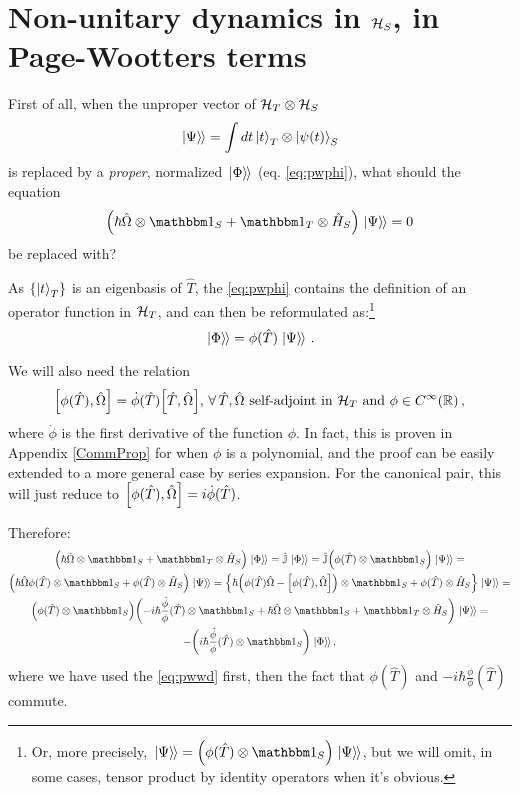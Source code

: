 \section{Non-unitary dynamics in $\mathcal{H}_S$, in Page-Wootters terms}

First of all,
when the unproper vector of $\mathcal{H}_T \otimes \mathcal{H}_S$
\begin{equation}
  \left.\left| \Psi \right\rangle\hspace{-0.115em}\right\rangle = \int dt \ket{t}_{T} \otimes \ket{\psi(t)}_{S}
\end{equation}
is replaced by a \emph{proper}, normalized $\left.\left| \Phi \right\rangle\hspace{-0.115em}\right\rangle$ (eq. \ref{eq:pwphi}),
what should the equation
\begin{equation}\label{eq:pwwd}
  \qty(\hbar\hat{\Omega} \ox \idop_S + \idop_T \ox \hat{H}_S)\dket{\Psi} = 0
\end{equation}
be replaced with?

As $\left\{\ket{t}_T\right\}$ is an eigenbasis of $\hat{T}$, the \eqref{eq:pwphi}
contains the definition of an operator function in $\mathcal{H}_T$,
and can then be reformulated as:\footnote{
  Or, more precisely, $\dket{\Psi} = \qty( \phi(\hat{T}) \ox \idop_S ) \dket{\Psi}$,
  but we will omit, in some cases,
  tensor product by identity operators
  when it's obvious.
}
\begin{equation}
  \left.\left| \Phi \right\rangle\hspace{-0.115em}\right\rangle = \phi(\hat{T})\left.\left| \Psi \right\rangle\hspace{-0.115em}\right\rangle \, \text{.}
\end{equation}

We will also need the relation
\begin{equation}\label{eq:fcomm}
  \comm{\phi(\hat{T})}{\hat{\Omega}} = \dot{\phi}(\hat{T}) \comm{\hat{T}}{\hat{\Omega}}, \,
    \forall \, \hat{T}, \hat{\Omega} \text{ self-adjoint in } \hilb{H}_T \text{ and } \phi \in C^{\infty}(\mathbb{R}) \, \text{,} 
\end{equation}
where $\dot{\phi}$ is the first derivative of the function $\phi$.
In fact, this is proven in Appendix \ref{CommProp} for when $\phi$ is a polynomial,
and the proof can be easily extended to a more general case by series expansion.
For the canonical pair, this will just reduce to $\comm{\phi(\hat{T})}{\hat{\Omega}} = i \dot{\phi} (\hat{T})$.

Therefore:
\begin{multline}\label{eq:complex_dynam_deriv}
  \qty( \hbar\hat{\Omega} \ox \idop_S + \idop_T \ox \hat{H}_S ) \dket{\Phi} =
  \hat{\mathbb{J}}\dket{\Phi} =
  \hat{\mathbb{J}} \qty( \phi(\hat{T}) \ox \idop_S) \dket{\Psi} =
  \\
  \qty( \hbar\hat{\Omega}\phi(\hat{T}) \ox \idop_S + \phi(\hat{T}) \ox \hat{H}_S )\dket{\Psi} =
  \qty{
    \hbar\qty( \phi(\hat{T})\hat{\Omega} - \comm{\phi(\hat{T})}{\hat{\Omega}} ) \ox \idop_S +
    \phi(\hat{T}) \ox \hat{H}_S
  }\dket{\Psi} =
  \\
  \qty(
    \phi(\hat{T}) \ox \idop_S
  )
  \qty(
    - i \hbar \frac{\dot{\phi}}{\phi} (\hat{T}) \ox \idop_S
    + \hbar\hat{\Omega} \ox \idop_S
    + \idop_T \ox \hat{H}_S
  ) \dket{\Psi} =
  \\
  - \qty( i \hbar \frac{\dot{\phi}}{\phi} (\hat{T}) \ox \idop_S ) \dket{\Phi}
  \text{,}
\end{multline}
where we have used the \eqref{eq:pwwd} first, then the fact that $\phi(\hat{T})$ 
and $-i\hbar\frac{\dot{\phi}}{\phi}(\hat{T})$ commute.

